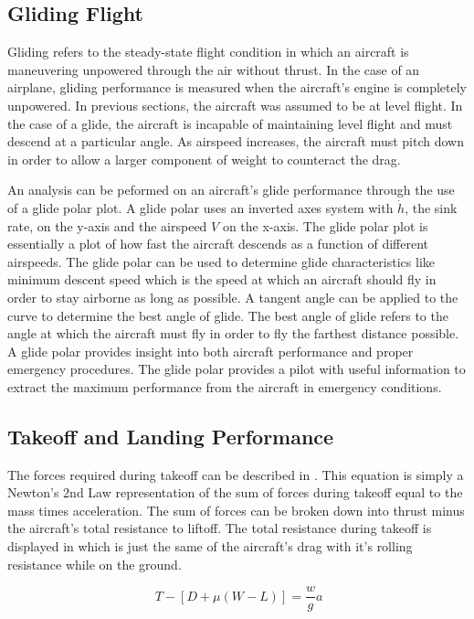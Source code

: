 \documentclass[conf]{new-aiaa}
\begin{document}
\subsection{Gliding Flight}

Gliding refers to the steady-state flight condition in which an aircraft is maneuvering unpowered through the air without thrust. In the case of an airplane, gliding performance is measured when the aircraft's engine is completely unpowered. In previous sections, the aircraft was assumed to be at level flight. In the case of a glide, the aircraft is incapable of maintaining level flight and must descend at a particular angle. As airspeed increases, the aircraft must pitch down in order to allow a larger component of weight to counteract the drag.

An analysis can be peformed on an aircraft's glide performance through the use of a glide polar plot. A glide polar uses an inverted axes system with \(\dot{h}\), the sink rate, on the y-axis and the airspeed \(V\) on the x-axis. The glide polar plot is essentially a plot of how fast the aircraft descends as a function of different airspeeds. The glide polar can be used to determine glide characteristics like minimum descent speed which is the speed at which an aircraft should fly in order to stay airborne as long as possible. A tangent angle can be applied to the curve to determine the best angle of glide. The best angle of glide refers to the angle at which the aircraft must fly in order to fly the farthest distance possible. A glide polar provides insight into both aircraft performance and proper emergency procedures. The glide polar provides a pilot with useful information to extract the maximum performance from the aircraft in emergency conditions. 

\subsection{Takeoff and Landing Performance}


The forces required during takeoff can be described in . This equation is simply a Newton's 2nd Law representation of the sum of forces during takeoff equal to the mass times acceleration. The sum of forces can be broken down into thrust minus the aircraft's total resistance to liftoff. The total resistance during takeoff is displayed in  which is just the same of the aircraft's drag with it's rolling resistance while on the ground.

\begin{equation} \label{TO}
\ T - [D + \mu (W-L)] = \dfrac{w}{g}a
\end{equation}
\end{document}
